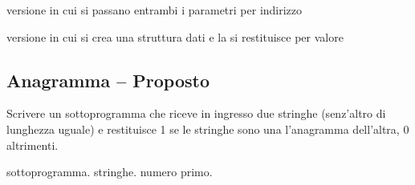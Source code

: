 
versione in cui si passano entrambi i parametri per indirizzo


versione in cui si crea una struttura dati e la si restituisce per valore


\prosep{}

\subsection{Anagramma -- Proposto}
Scrivere un sottoprogramma che riceve in ingresso due stringhe (senz'altro di lunghezza uguale) e
restituisce 1 se le stringhe sono una l'anagramma dell'altra, 0 altrimenti.

\begin{tags}
sottoprogramma. stringhe. numero primo.
\end{tags}


